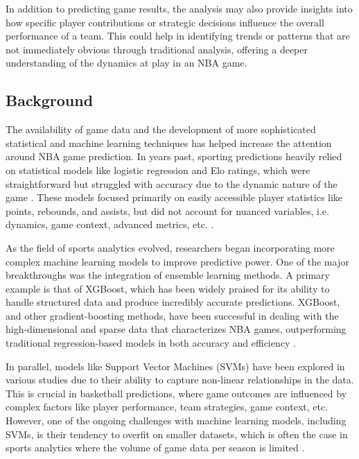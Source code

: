 \documentclass[11pt]{article}
\begin{document}
\medskip

In addition to predicting game results, the analysis may also provide insights into how specific player
contributions or strategic decisions influence the overall performance of a team. This could help in identifying
trends or patterns that are not immediately obvious through traditional analysis, offering a deeper
understanding of the dynamics at play in an NBA game.

\medskip



\subsection{Background}

The availability of game data and the development of more sophisticated statistical and machine learning techniques has helped increase the attention around NBA game prediction. In years past, sporting predictions heavily relied on statistical models like logistic regression and Elo ratings, which were straightforward but struggled with accuracy due to the dynamic nature of the game \cite{Manner_2016}. These models focused primarily on easily accessible player statistics like points, rebounds, and assists, but did not account for nuanced variables, i.e. dynamics, game context, advanced metrics, etc. \cite{Kubatko_Oliver_Pelton_Rosenbaum_2007}.\medskip

As the field of sports analytics evolved, researchers began incorporating more complex machine learning models to improve predictive power. One of the major breakthroughs was the integration of ensemble learning methods. A primary example is that of XGBoost, which has been widely praised for its ability to handle structured data and produce incredibly accurate predictions. XGBoost, and other gradient-boosting methods, have been successful in dealing with the high-dimensional and sparse data that characterizes NBA games, outperforming traditional regression-based models in both accuracy and efficiency \cite{Horvat_Job_2022}.\medskip

In parallel, models like Support Vector Machines (SVMs) have been explored in various studies due to their ability to capture non-linear relationships in the data. This is crucial in basketball predictions, where game outcomes are influenced by complex factors like player performance, team strategies, game context, etc. However, one of the ongoing challenges with machine learning models, including SVMs, is their tendency to overfit on smaller datasets, which is often the case in sports analytics where the volume of game data per season is limited \cite{Horvat_Job_2022}. \medskip
\end{document}
